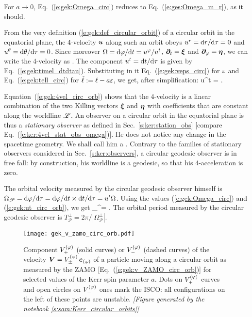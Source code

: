 \begin{remark}
For $a\to 0$, Eq.~(\ref{e:gek:Omega_circ}) reduces to Eq.~(\ref{e:ges:Omega_m_r}), as it should.
\end{remark}

From the very definition (\ref{e:gek:def_circular_orbit}) of a circular orbit
in the equatorial plane, the 4-velocity $\bm{u}$ along such an orbit
obeys $u^r = \mathrm{d} r/\mathrm{d}\tau = 0$ and $u^\theta = \mathrm{d}\theta/\mathrm{d}\tau = 0$. Since moreover
$\Omega = \mathrm{d}\varphi/\mathrm{d} t = u^\varphi / u^t$, $\bm{\partial}_t = \bm{\xi}$ and $\bm{\partial}_\varphi = \bm{\eta}$,
we can write the 4-velocity as
\be \label{e:gek:4vel_circ_orb}
     .
\ee
The component $u^t = \mathrm{d} t / \mathrm{d}\tau$ is given by Eq.~(\ref{e:gek:timel_dtdtau}).
Substituting in it Eq.~(\ref{e:gek:veps_circ}) for $\varepsilon$
and Eq.~(\ref{e:gek:tell_circ}) for $\tilde{\ell} := \ell - a \varepsilon$, we
get, after simplification:
\be \label{e:gek:ut_circ_orb}
    u^t =  .
\ee

Equation~(\ref{e:gek:4vel_circ_orb}) shows that the 4-velocity is a linear
combination of the two Killing vectors $\bm{\xi}$ and $\bm{\eta}$ with
coefficients that are constant along the worldline $\mathscr{L}$. An observer on
a circular orbit in the equatorial plane is thus a
\emph{stationary observer} as defined in Sec.~\ref{s:ker:station_obs}
[compare Eq.~(\ref{e:ker:4vel_stat_obs_omega})]. He does not notice any change in the spacetime
geometry. We shall call him a .
Contrary to the families of stationary observers considered in Sec.~\ref{s:ker:observers},
a circular geodesic observer is in free fall: by construction, his worldline is a geodesic, so that
his 4-acceleration is zero.

The orbital velocity measured by the circular geodesic observer himself is
$\Omega_{\mathscr{P}} = \mathrm{d}\varphi / \mathrm{d}\tau = \mathrm{d}\varphi / \mathrm{d} t \times \mathrm{d} t / \mathrm{d} \tau = u^t \Omega$.
Using the values (\ref{e:gek:Omega_circ}) and (\ref{e:gek:ut_circ_orb}), we get
\be
    \Omega_{}^\pm = \pm {} .
\ee
The orbital period measured by the circular geodesic observer is
$T_{\mathscr{P}}^\pm = 2\pi / |\Omega_{\mathscr{P}}^\pm |$.


\begin{figure}
\centerline{\texttt{[image: gek\_v\_zamo\_circ\_orb.pdf]}}
\caption[]{\label{f:gek:v_zamo_circ_orb} \footnotesize
Component $V^{(\varphi)}_+$  (solid curves) or $V^{(\varphi)}_-$
(dashed curves) of the velocity $\bm{V} = V^{(\varphi)}_\pm \, \bm{e}_{(\varphi)}$
of a particle moving along a circular
orbit as measured by the ZAMO [Eq.~(\ref{e:gek:v_ZAMO_circ_orb})]
for selected values of the Kerr spin parameter $a$.
Dots on $V^{(\varphi)}_+$  curves and open circles on $V^{(\varphi)}_-$  ones mark the ISCO: all
configurations on the left of these points are unstable.
\textsl{[Figure generated by the notebook \ref{s:sam:Kerr_circular_orbits}]}
}
\end{figure}

